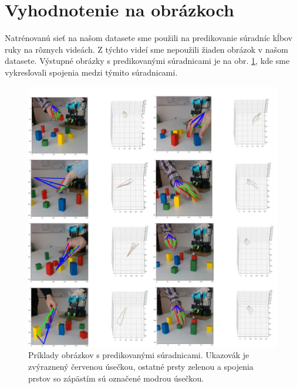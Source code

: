 \section{Vyhodnotenie na obrázkoch}
Natrénovanú sieť na našom datasete sme použili na predikovanie súradníc kĺbov ruky na rôznych videách. Z týchto videí sme nepoužili žiaden obrázok v našom datasete. Výstupné obrázky s predikovanými súradnicami je na obr. \ref{img:predicted_hands}, kde sme vykresľovali spojenia medzi týmito súradnicami.

\begin{figure}[H]
	\begin{center}
		\includegraphics[width=\textwidth]{images/predicted_hands.jpg}
		\caption{Príklady obrázkov s predikovanými súradnicami. Ukazovák je zvýraznený červenou úsečkou, ostatné prsty zelenou a spojenia prstov so zápästím sú označené modrou úsečkou.}
		\label{img:predicted_hands}
	\end{center}
\end{figure}